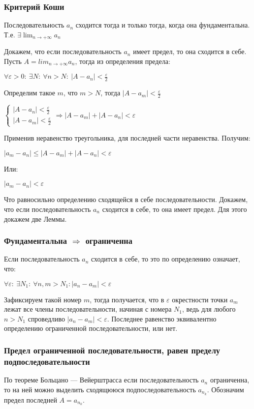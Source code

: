 \subsubsection{Критерий Коши}
\begin{mydef}
Последовательность $a_n$ сходится тогда и только тогда, когда она фундаментальна. Т.е. 
$\displaystyle \exists \lim_{n \to +\infty} a_n$
\end{mydef}
Докажем, что если последовательность $a_n$ имеет предел, то она сходится в себе. Пусть 
$\displaystyle A=lim_{n \to +\infty}a_n$, тогда из определения предела:
\begin{center}$\forall \varepsilon > 0: \ \exists N : \ \forall n > N: \ |A - a_n| < 
\frac{\varepsilon}{2}$\end{center}
Определим такое $m$, что $m > N$, тогда $|A - a_m| < \frac{\varepsilon}{2}$
\begin{center}$\begin{cases}
|A - a_n| < \frac{\varepsilon}{2} \\
|A - a_m| < \frac{\varepsilon}{2}
\end{cases} \Longrightarrow  |A - a_m| + |A - a_n| < \varepsilon$
\end{center}
Применив неравенство треугольника, для последней части неравенства. Получим:
\begin{center}$|a_m - a_n| \leq |A - a_m| + |A - a_n| < \varepsilon$ \end{center}
Или:
\begin{center}$|a_m - a_n| < \varepsilon$ \end{center}
Что равносильно определению сходящейся в себе последовательности. \newline\newline
Докажем, что если последовательность $a_n$ сходится в себе, то она имеет предел. Для этого докажем 
две Леммы.
\subsubsection{Фундаментальна $\Rightarrow$ ограниченна}
Если последовательность $a_n$ сходится в себе, то это по определению означает, что:
\begin{center}$\forall \varepsilon: \ \exists N_1: \ \forall n, m > N_1: |a_n - a_m| < \varepsilon 
$\end{center}
Зафиксируем такой номер $m$, тогда получается, что в $\varepsilon$ окрестности точки $a_m$ лежат все 
члены последовательности, начиная с номера $N_1$, ведь для любого $n > N_1$ спроведливо $|a_n - a_m| 
< \varepsilon$. Последнее равенство эквивалентно определению ограниченной последовательности, или 
нет.
\subsubsection{Предел ограниченной последовательности, равен пределу подпоследовательности}
По теореме Больцано — Вейерштрасса если последовательность $a_n$ ограниченна, то на ней можно 
выделить сходящююся подпоследовательность $a_{n_k}$. Обозначим предел последней $A = a_{n_k}$.

